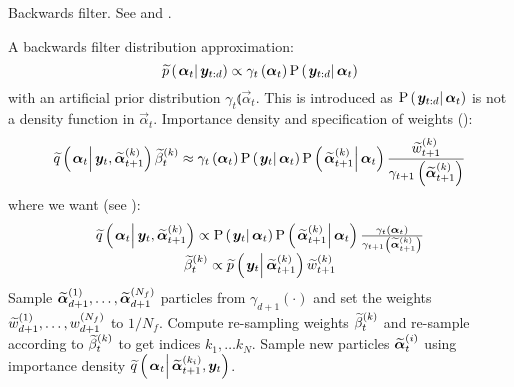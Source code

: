 \begin{algorithm}[H]
\caption{Backwards filter. See \cite{briers10} and \cite{fearnhead10}.}\label{alg:backward}
\begin{algorithmic}[1]\raggedright
\INPUT
\Statex A backwards filter distribution approximation:
\begin{equation}
	\propAproxC{\vec{\alpha}_t}{\vec{y}_{t:d}} \propto \gamma_t \Lparen{\vec{\alpha}_t}\propC{\vec{y}_{t:d}}{\vec{\alpha}_t}
\end{equation} 
\Statex with an  artificial prior distribution $\gamma_t \Lparen{\vec{\alpha}_t}$. This is introduced as $\propC{\vec{y}_{t:d}}{\vec{\alpha}_t}$ is not a density function in $\vec{\alpha}_t$.
\Statex Importance density and specification of weights {\footnotesize (\citet[page 451 -- look in the example in the appendix]{fearnhead10})}:
\Statex\begin{equation}
	\IDAproxC{\vec{\alpha}_t}{\vec{y}_t, \particB{\vec{\alpha}}{t + 1}{k}}\particB{\beta}{t}{k} \approx %
		\gamma_t\Lparen{\vec{\alpha}_t}
		\propC{\vec{y}_t}{\vec{\alpha}_t}
		\propC{\particB{\vec{\alpha}}{t + 1}{k}}{\vec{\alpha}_t}
		\frac{\particB{w}{t + 1}{k}}{\gamma_{t + 1}\Lparen{\particB{\vec{\alpha}}{t + 1}{k}}}
\end{equation}
\Statex where we want {\footnotesize (see \citet[page 74]{briers10})}:
\Statex\begin{equation}\begin{matrix}
	\IDAproxC{\vec{\alpha}_t}{\vec{y}_t, \particB{\vec{\alpha}}{t + 1}{k}} \propto %
		\propC{\vec{y}_t}{\vec{\alpha}_t}
		\propC{\particB{\vec{\alpha}}{t + 1}{k}}{\vec{\alpha}_t}
		\frac{\gamma_t\Lparen{\vec{\alpha}_t}}{\gamma_{t + 1}\Lparen{\particB{\vec{\alpha}}{t + 1}{k}}} \\
	\particB{\beta}{t}{k} \propto %
		 \propAproxC{\vec{y}_t}{\particB{\vec{\alpha}}{t + 1}{k}}\particB{w}{t + 1}{k}
\end{matrix}\end{equation}
%
\State Sample $\widetilde{\bm{\alpha}}_{d+1}^{\left( 1\right)},\dots,\widetilde{\bm{\alpha}}_{d+1}^{\left( N_f\right)}$ particles from $\gamma_{d+1}(\cdot)$ and set the weights $\widetilde{w}_{d + 1}^{\left( 1\right)},\dots,w_{d+1}^{\left( N_f\right)}$ to $1 / N_f$.
%
\State Compute re-sampling weights $\widetilde{\beta}_{t}^{\left( k\right)}$ and re-sample according to $\widetilde{\beta}_{t}^{\left( k\right)}$ to get indices $k_1,\dots k_N$.
\EndProcedure
%
\State Sample new particles $\widetilde{\bm{\alpha}}_{t}^{\left( i\right)}$ using importance density $\IDAproxC{\vec{\alpha}_t}{\particB{\vec{\alpha}}{t + 1}{k_i}, \vec{y}_t}$.

\end{algorithmic}
\end{algorithm}
